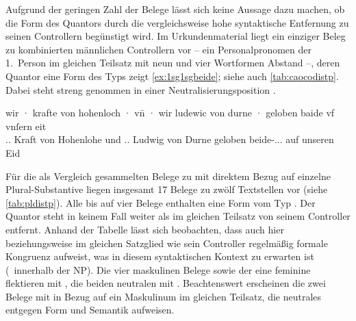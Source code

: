 Aufgrund der geringen Zahl der Belege lässt sich keine Aussage dazu machen, ob
die Form des Quantors durch die vergleichsweise hohe syntaktische Entfernung zu
seinen Controllern begünstigt wird. Im Urkundenmaterial liegt ein einziger
Beleg zu kombinierten männlichen Controllern vor -- ein Personalpronomen der
1.~Person im gleichen Teilsatz mit neun und vier Wortformen Abstand --, deren
Quantor eine Form des Typs  zeigt \cref{ex:1sg1sgbeide}; siehe auch
\cref{tab:caocodistp}. Dabei steht  streng genommen in einer
Neutralisierungsposition
\autocites[vgl.][90--91]{askedal1973}[191]{gjelsten1980}.

\begin{exe}
\ex\label{ex:1sg1sgbeide}
	\gll wir · krafte von hohenloch · vn̄ · wir
		ludewic von durne · geloben baide vf vnſern eit \\
		\Fsg\subM.\Hon.\Nom{} {} Kraft von Hohenlohe {} und {}
		\Fsg\subM.\Hon.\Nom{} Ludwig von Durne {} geloben
		beide-\Nom.\Pl.\MascM.\St{} auf unseren Eid \\
	\begin{taggedline}{\parencites(Burg Hohlach, Kr.~Neustadt an der Aisch-Bad Windsheim, 1296)[\pno~2529, 563.5--6]{cao3}}
	\trans {}
	\end{taggedline}
\end{exe}

Für die als Vergleich gesammelten Belege zu  mit direktem Bezug auf
einzelne Plural-Substantive liegen insgesamt 17 Belege zu zwölf Textstellen vor
(siehe \cref{tab:pldistp}). Alle bis auf vier Belege enthalten eine Form vom
Typ . Der Quantor steht in keinem Fall weiter als im gleichen
Teilsatz von seinem Controller entfernt. Anhand der Tabelle lässt sich
beobachten, dass auch hier  beziehungsweise  im
gleichen Satzglied wie sein Controller regelmäßig formale Kongruenz aufweist,
was in diesem syntaktischen Kontext zu erwarten ist (\Concord\ innerhalb der
NP). Die vier maskulinen Belege sowie der eine feminine flektieren mit
, die beiden neutralen mit . Beachtenswert erscheinen die
zwei Belege mit  in Bezug auf ein Maskulinum im gleichen Teilsatz,
die neutrales  entgegen Form und Semantik aufweisen.

